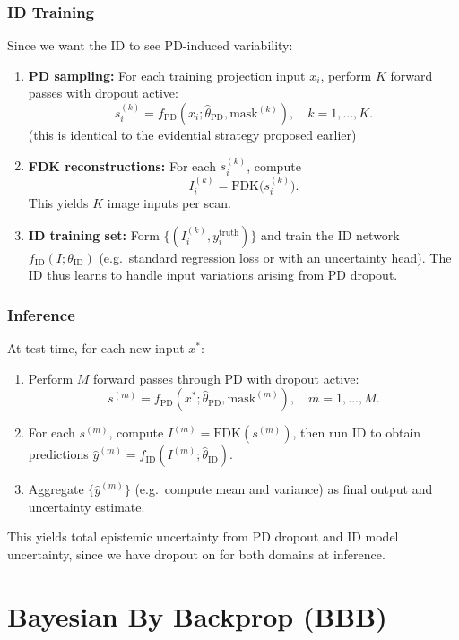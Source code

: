 \documentclass{article}
\newcommand{\0}{\varnothing}
\theoremstyle{definition}
\begin{document}
\subsubsection{ID Training}
Since we want the ID to see PD-induced variability:
\begin{enumerate}[1.]
  \item \textbf{PD sampling:} For each training projection input $x_i$, perform $K$ forward passes with dropout active:
    \[
      s_i^{(k)} = f_\text{PD}(x_i;\hat\theta_\text{PD},\text{mask}^{(k)}),\quad k=1,\dots,K.
    \]
    (this is identical to the evidential strategy proposed earlier)
  \item \textbf{FDK reconstructions:} For each $s_i^{(k)}$, compute 
    \[
      I_i^{(k)} = \mathrm{FDK}\bigl(s_i^{(k)}\bigr).
    \]
    This yields $K$ image inputs per scan.
  \item \textbf{ID training set:} Form $\{(I_i^{(k)},y_i^\text{truth})\}$ and train the ID network $f_\text{ID}(I;\theta_\text{ID})$ (e.g.\ standard regression loss or with an uncertainty head). The ID thus learns to handle input variations arising from PD dropout.
\end{enumerate}

\subsubsection{Inference}
At test time, for each new input $x^\ast$:
\begin{enumerate}[1.]
  \item Perform $M$ forward passes through PD with dropout active:
    \[
      s^{(m)} = f_\text{PD}(x^\ast;\hat\theta_\text{PD},\text{mask}^{(m)}), \quad m=1,\dots,M.
    \]
  \item For each $s^{(m)}$, compute $I^{(m)} = \mathrm{FDK}(s^{(m)})$, then run ID to obtain predictions $\hat y^{(m)} = f_\text{ID}(I^{(m)};\hat\theta_\text{ID})$.
  \item Aggregate $\{\hat y^{(m)}\}$ (e.g.\ compute mean and variance) as final output and uncertainty estimate.
\end{enumerate}
This yields total epistemic uncertainty from PD dropout and ID model uncertainty, since we have dropout on for both domains at inference.  


\section{Bayesian By Backprop (BBB)}
\end{document}
